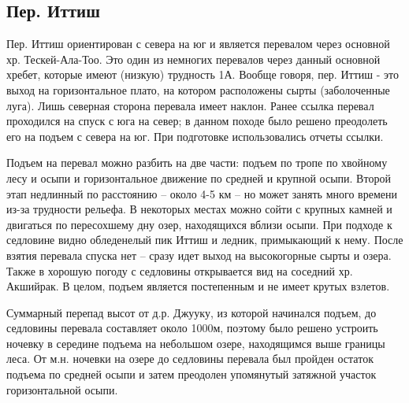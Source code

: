 \subsection{Пер. Иттиш}

Пер. Иттиш ориентирован с севера на юг и является перевалом через основной хр. Тескей-Ала-Тоо. Это один из немногих перевалов через данный основной хребет, которые имеют (низкую) трудность 1А. Вообще говоря, пер. Иттиш - это выход на горизонтальное плато, на котором расположены сырты (заболоченные луга). Лишь северная сторона перевала имеет наклон. Ранее \alert{ссылка} перевал проходился на спуск с юга на север; в данном походе было решено преодолеть его на подъем с севера на юг. При подготовке использовались отчеты \alert{ссылки}.

Подъем на перевал можно разбить на две части: подъем по тропе по хвойному лесу и осыпи и горизонтальное движение по средней и крупной осыпи. Второй этап недлинный по расстоянию -- около 4-5 км -- но может занять много времени из-за трудности рельефа. В некоторых местах можно сойти с крупных камней и двигаться по пересохшему дну озер, находящихся вблизи осыпи. При подходе к седловине видно обледенелый пик Иттиш и ледник, примыкающий к нему. После взятия перевала спуска нет -- сразу идет выход на высокогорные сырты и озера. Также в хорошую погоду с седловины открывается вид на соседний хр. Акшийрак. В целом, подъем является постепенным и не имеет крутых взлетов.

Суммарный перепад высот от д.р. Джууку, из которой начинался подъем, до седловины перевала составляет около 1000м, поэтому было решено устроить ночевку в середине подъема на небольшом озере, находящимся выше границы леса. От м.н. ночевки на озере до седловины перевала был пройден остаток подъема по средней осыпи и затем преодолен упомянутый затяжной участок горизонтальной осыпи.
